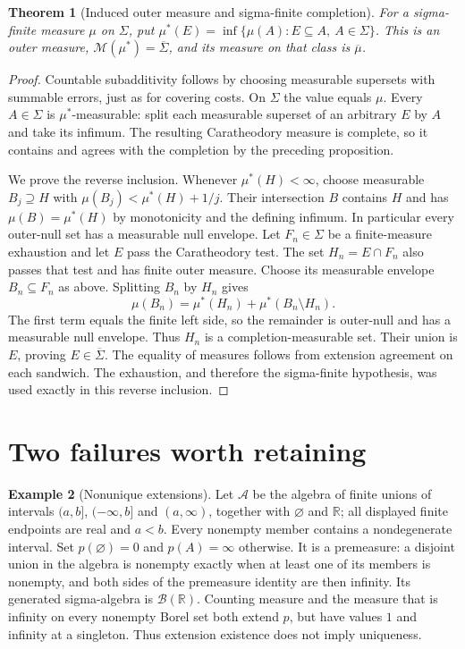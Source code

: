 \documentclass[11pt,oneside,openany]{book}
\newtheorem{theorem}{Theorem}[chapter]
\theoremstyle{definition}
\newtheorem{example}[theorem]{Example}
\theoremstyle{remark}
\newcommand{\R}{\mathbb R}\newcommand{\C}{\mathbb C}
\newcommand{\BB}{\mathcal B}\newcommand{\SSS}{\mathcal S}
\newcommand{\calA}{\mathcal A}\newcommand{\LL}{\mathcal L}
\newcommand{\family}[1]{}
\begin{document}
\begin{theorem}[Induced outer measure and sigma-finite completion]
\family{D11.02.induced_outer_completion}\label{d11:02:induced-outer-completion}
For a sigma-finite measure $\mu$ on $\Sigma$, put
$\mu^*(E)=\inf\{\mu(A):E\subseteq A,\ A\in\Sigma\}$.
This is an outer measure, $\mathcal M(\mu^*)=\overline\Sigma$, and its
measure on that class is $\overline\mu$.
\end{theorem}
\begin{proof}
Countable subadditivity follows by choosing measurable supersets with
summable errors, just as for covering costs. On $\Sigma$ the value equals
$\mu$. Every $A\in\Sigma$ is $\mu^*$-measurable: split each measurable
superset of an arbitrary $E$ by $A$ and take its infimum. The resulting
Caratheodory measure is complete, so it contains and agrees with the
completion by the preceding proposition.

We prove the reverse inclusion. Whenever $\mu^*(H)<\infty$, choose
measurable $B_j\supseteq H$ with
$\mu(B_j)<\mu^*(H)+1/j$. Their intersection $B$ contains $H$ and has
$\mu(B)=\mu^*(H)$ by monotonicity and the defining infimum.
In particular every outer-null set has a measurable null envelope.
Let $F_n\in\Sigma$ be a finite-measure exhaustion and let $E$ pass the
Caratheodory test. The set $H_n=E\cap F_n$ also passes that test and has
finite outer measure. Choose its measurable envelope $B_n\subseteq F_n$
as above. Splitting $B_n$ by $H_n$ gives
\[
 \mu(B_n)=\mu^*(H_n)+\mu^*(B_n\setminus H_n).
\]
The first term equals the finite left side, so the remainder is outer-null
and has a measurable null envelope. Thus $H_n$ is a completion-measurable
set. Their union is $E$, proving $E\in\overline\Sigma$.
The equality of measures follows from extension agreement on each sandwich.
The exhaustion, and therefore the sigma-finite hypothesis, was used exactly
in this reverse inclusion.
\end{proof}

\section{Two failures worth retaining}

\begin{example}[Nonunique extensions]
\family{D11.02.extension_nonuniqueness}\label{d11:02:extension-nonuniqueness}
Let $\calA$ be the algebra of finite unions of intervals $(a,b]$, $(-\infty,b]$
and $(a,\infty)$, together with $\varnothing$ and $\R$; all displayed finite
endpoints are real and $a<b$. Every nonempty member contains a nondegenerate
interval. Set $p(\varnothing)=0$ and $p(A)=\infty$ otherwise.
It is a premeasure: a disjoint union in the algebra is nonempty exactly when
at least one of its members is nonempty, and both sides of the premeasure
identity are then infinity. Its generated sigma-algebra is $\BB(\R)$.
Counting measure and the measure that is infinity on every nonempty Borel
set both extend $p$, but have values $1$ and infinity at a singleton.
Thus extension existence does not imply uniqueness.
\end{example}
\end{document}
